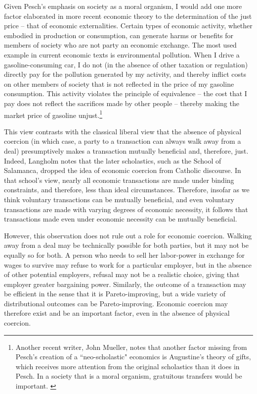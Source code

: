\documentclass{article}
\begin{document}
Given Pesch’s emphasis on society as a moral organism, I would add one more factor elaborated in more recent economic theory to the determination of the just price – that of economic externalities.  Certain types of economic activity, whether embodied in production or consumption, can generate harms or benefits for members of society who are not party an economic exchange.  The most used example in current economic texts is environmental pollution.  When I drive a gasoline-consuming car, I do not (in the absence of other taxation or regulation) directly pay for the pollution generated by my activity, and thereby inflict costs on other members of society that is not reflected in the price of my gasoline consumption.  This activity violates the principle of equivalence – the cost that I pay does not reflect the sacrifices made by other people – thereby making the market price of gasoline unjust.\footnote{Another recent writer, John Mueller, notes that another factor missing from Pesch's creation of a ``neo-scholastic" economics is Augustine's theory of gifts, which receives more attention from the original scholastics than it does in Pesch.  In a society that is a moral organism, gratuitous transfers would be important. \citep[pp. 117-125]{mueller2010}}\medskip

This view contrasts with the classical liberal view that the absence of physical coercion (in which case, a party to a transaction can always walk away from a deal) presumptively makes a transaction mutually beneficial and, therefore, just.  Indeed, Langholm notes that the later scholastics, such as the School of Salamanca, dropped the idea of economic coercion from Catholic discourse.  In that school’s view, nearly all economic transactions are made under binding constraints, and therefore, less than ideal circumstances.  Therefore, insofar as we think voluntary transactions can be mutually beneficial, and even voluntary transactions are made with varying degrees of economic necessity, it follows that transactions made even under economic necessity can be mutually beneficial.\medskip

However, this observation does not rule out a role for economic coercion.  Walking away from a deal may be technically possible for both parties, but it may not be equally so for both.  A person who needs to sell her labor-power in exchange for wages to survive may refuse to work for a particular employer, but in the absence of other potential employers, refusal may not be a realistic choice, giving that employer greater bargaining power.  Similarly, the outcome of a transaction may be efficient in the sense that it is Pareto-improving, but a wide variety of distributional outcomes can be Pareto-improving.  Economic coercion may therefore exist and be an important factor, even in the absence of physical coercion.\medskip
\end{document}
